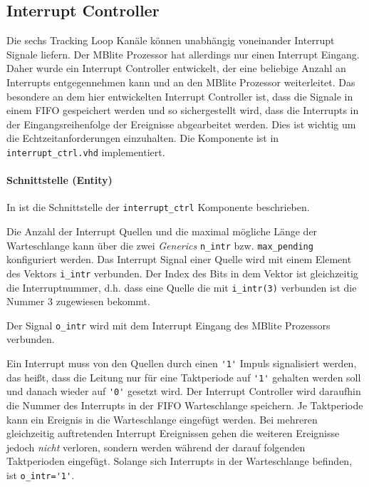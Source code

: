 \subsection{Interrupt Controller}
\label{InterruptController}
Die sechs Tracking Loop Kanäle können unabhängig voneinander Interrupt Signale liefern. Der MBlite Prozessor hat allerdings nur einen Interrupt Eingang. Daher wurde ein Interrupt Controller entwickelt, der eine beliebige Anzahl an Interrupts entgegennehmen kann und an den MBlite Prozessor weiterleitet. Das besondere an dem hier entwickelten Interrupt Controller ist, dass die Signale in einem FIFO gespeichert werden und so sichergestellt wird, dass die Interrupts in der Eingangsreihenfolge der Ereignisse abgearbeitet werden. Dies ist wichtig um die Echtzeitanforderungen einzuhalten. Die Komponente ist in \lstinline$interrupt_ctrl.vhd$ implementiert. 


\paragraph{Schnittstelle (Entity)}
In  ist die Schnittstelle der \lstinline$interrupt_ctrl$ Komponente beschrieben.

Die Anzahl der Interrupt Quellen und die maximal mögliche Länge der Warteschlange kann über die zwei \emph{Generics} \lstinline$n_intr$ bzw. \lstinline$max_pending$ konfiguriert werden. Das Interrupt Signal einer Quelle wird mit einem Element des Vektors \lstinline$i_intr$ verbunden. Der Index des Bits in dem Vektor ist gleichzeitig die Interruptnummer, d.h. dass eine Quelle die mit \lstinline$i_intr(3)$ verbunden ist die Nummer 3 zugewiesen bekommt.

Der Signal \lstinline$o_intr$ wird mit dem Interrupt Eingang des MBlite Prozessors verbunden. 

Ein Interrupt muss von den Quellen durch einen  \lstinline$'1'$ Impuls signalisiert werden, das heißt, dass die Leitung nur für eine Taktperiode auf  \lstinline$'1'$ gehalten werden soll und danach wieder auf  \lstinline$'0'$ gesetzt wird. Der Interrupt Controller wird daraufhin die Nummer des Interrupts in der FIFO Warteschlange speichern. Je Taktperiode kann ein Ereignis in die Warteschlange eingefügt werden. Bei mehreren gleichzeitig auftretenden Interrupt Ereignissen gehen die weiteren Ereignisse jedoch \emph{nicht} verloren, sondern werden während der darauf folgenden Taktperioden eingefügt. Solange sich Interrupts in der Warteschlange befinden, ist \lstinline$o_intr='1'$. 

